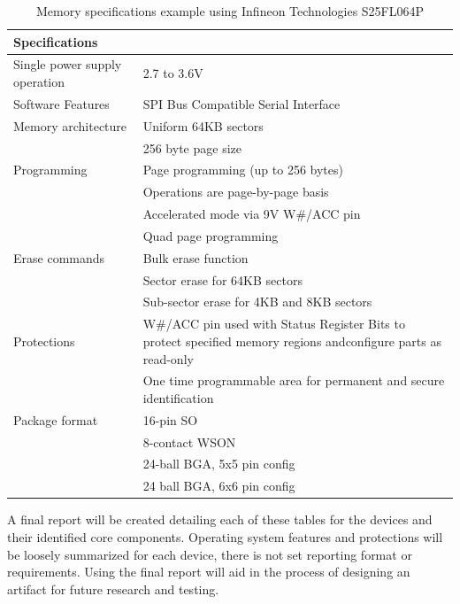 \begin{table}[H]
  \centering
  \begin{tabular}{|p{6cm}|p{9cm}|}
    \hline\rowcolor{gray!30}

    \textbf{Specifications} &  \\
    \hline

    Single power supply operation & 2.7 to 3.6V \\
    \hline

    Software Features & SPI Bus Compatible Serial Interface \\
    \hline

    Memory architecture & Uniform 64KB sectors \\
    & 256 byte page size \\
    \hline

    Programming & Page programming (up to 256 bytes) \\
    & Operations are page-by-page basis \\
    & Accelerated mode via 9V W\#/ACC pin \\
    & Quad page programming \\
    \hline

    Erase commands & Bulk erase function \\
     & Sector erase for 64KB sectors \\
     & Sub-sector erase for 4KB and 8KB sectors \\
    \hline

    Protections & W\#/ACC pin used with Status Register Bits to protect specified memory regions andconfigure parts as read-only \\
    & One time programmable area for permanent and secure identification \\
    \hline

    Package format & 16-pin SO \\
    & 8-contact WSON \\
    & 24-ball BGA, 5x5 pin config \\
    & 24 ball BGA, 6x6 pin config \\
    \hline

  \end{tabular}
  \caption{Memory specifications example using Infineon Technologies S25FL064P \autocite{S25FL064PSeriesFlash}}
  \label{fig:memory_specs}%
\end{table}

A final report will be created detailing each of these tables for the devices and their identified core components. Operating system features and protections will be loosely summarized for each device, there is not set reporting format or requirements. Using the final report will aid in the process of designing an artifact for future research and testing.

